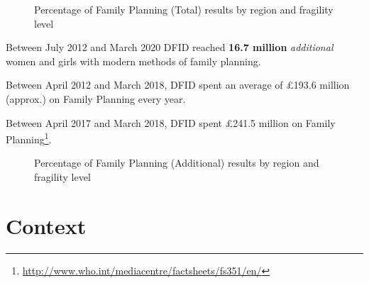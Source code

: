 \begin{figure}
	\centering
	\qquad
	\caption{Percentage of Family Planning (Total) results by region and fragility level}%
	\label{fig:family_total}
\end{figure}

Between July 2012 and March 2020 DFID reached \textbf{
16.7 million
} \textsl{additional} women and girls with modern methods of family planning. %

Between April 2012 and March 2018, DFID spent an average of \pounds 193.6 million (approx.) on Family Planning every year. %

Between April 2017 and March 2018, DFID spent \pounds 241.5 million on Family Planning\footnote{\href{http://www.who.int/mediacentre/factsheets/fs351/en/}{http://www.who.int/mediacentre/factsheets/fs351/en/}}. %

\begin{figure}
	\centering
	\qquad
	\caption{Percentage of Family Planning (Additional) results by region and fragility level}
	\label{fig:family_additional}
\end{figure}


\section{Context}

